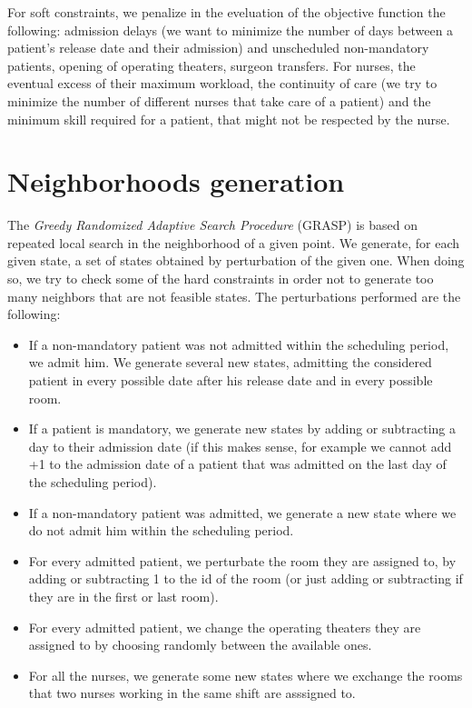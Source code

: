 \documentclass{article}
\begin{document}
For soft constraints, we penalize in the eveluation of the objective function the following: admission delays (we want to minimize the number of 
days between a patient's release date and their admission) and unscheduled non-mandatory patients, opening of operating theaters, surgeon transfers. 
For nurses, the eventual excess of their maximum workload, the continuity of care (we try to minimize the number of different nurses that take care of 
a patient) and the minimum skill required for a patient, that might not be respected by the nurse.

\section{Neighborhoods generation}
The \textit{Greedy Randomized Adaptive Search Procedure} (GRASP) is based on repeated local search in the neighborhood 
of a given point. We generate, for each given state, a set of states obtained by perturbation of the given one. When doing 
so, we try to check some of the hard constraints in order not to generate too many neighbors that are not feasible states.
The perturbations performed are the following:
\begin{itemize}
    \item If a non-mandatory patient was not admitted within the scheduling period, we admit him. We generate several new states, 
    admitting the considered patient in every possible date after his release date and in every possible room.
    \item If a patient is mandatory, we generate new states by adding or subtracting a day to their admission date (if this makes sense, for example 
    we cannot add +1 to the admission date of a patient that was admitted on the last day of the scheduling period).
    \item If a non-mandatory patient was admitted, we generate a new state where we do not admit him within the scheduling period.
    \item For every admitted patient, we perturbate the room they are assigned to, by adding or subtracting 1 to the id of the room (or just adding or 
    subtracting if they are in the first or last room).
    \item For every admitted patient, we change the operating theaters they are assigned to by choosing randomly between the available ones.
    \item For all the nurses, we generate some new states where we exchange the rooms that two nurses working in the same shift are asssigned to.
\end{itemize}
\end{document}
